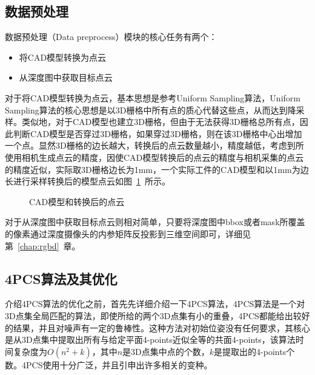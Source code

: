 \subsection{数据预处理}
数据预处理（Data preprocess）模块的核心任务有两个：
\begin{itemize}
\item 将CAD模型转换为点云
\item 从深度图中获取目标点云
\end{itemize}
对于将CAD模型转换为点云，基本思想是参考Uniform Sampling算法，Uniform Sampling算法的核心思想是以3D栅格中所有点的质心代替这些点，从而达到降采样。类似地，对于CAD模型也建立3D栅格，但由于无法获得3D栅格总所有点，因此判断CAD模型是否穿过3D栅格，如果穿过3D栅格，则在该3D栅格中心出增加一个点。显然3D栅格的边长越大，转换后的点云数量越小，精度越低，考虑到所使用相机生成点云的精度，因使CAD模型转换后的点云的精度与相机采集的点云的精度近似，实际取3D栅格边长为1mm，一个实际工件的CAD模型和以1mm为边长进行采样转换后的模型点云如图~\ref{fig:model-pc}~所示。
\begin{figure}[ht]
  \centering
  \hskip1cm
  \label{fig:model-pc}
  \caption{CAD模型和转换后的点云}
\end{figure}

对于从深度图中获取目标点云则相对简单，只要将深度图中bbox或者mask所覆盖的像素通过深度摄像头的内参矩阵反投影到三维空间即可，详细见第~\ref{chap:rgbd}~章。

\subsection{4PCS算法及其优化}
介绍4PCS算法的优化之前，首先先详细介绍一下4PCS算法，4PCS算法是一个对3D点集全局匹配的算法，即使所给的两个3D点集有小的重叠，4PCS都能给出较好的结果，并且对噪声有一定的鲁棒性。这种方法对初始位姿没有任何要求，其核心是从3D点集中提取出所有与给定平面4-points近似全等的共面4-points，该算法时间复杂度为$O(n^2+k)$，其中$n$是3D点集中点的个数，$k$是提取出的4-points个数。4PCS使用十分广泛，并且引申出许多相关的变种\cite{corsini2013fully}。


